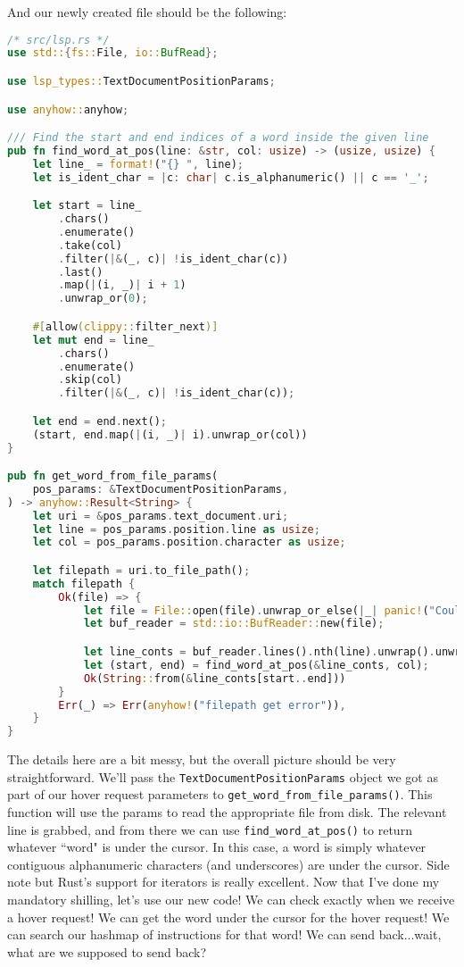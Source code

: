 And our newly created file should be the following:

\begin{lstlisting}[language=rust]
/* src/lsp.rs */
use std::{fs::File, io::BufRead};

use lsp_types::TextDocumentPositionParams;

use anyhow::anyhow;

/// Find the start and end indices of a word inside the given line
pub fn find_word_at_pos(line: &str, col: usize) -> (usize, usize) {
    let line_ = format!("{} ", line);
    let is_ident_char = |c: char| c.is_alphanumeric() || c == '_';

    let start = line_
        .chars()
        .enumerate()
        .take(col)
        .filter(|&(_, c)| !is_ident_char(c))
        .last()
        .map(|(i, _)| i + 1)
        .unwrap_or(0);

    #[allow(clippy::filter_next)]
    let mut end = line_
        .chars()
        .enumerate()
        .skip(col)
        .filter(|&(_, c)| !is_ident_char(c));

    let end = end.next();
    (start, end.map(|(i, _)| i).unwrap_or(col))
}

pub fn get_word_from_file_params(
    pos_params: &TextDocumentPositionParams,
) -> anyhow::Result<String> {
    let uri = &pos_params.text_document.uri;
    let line = pos_params.position.line as usize;
    let col = pos_params.position.character as usize;

    let filepath = uri.to_file_path();
    match filepath {
        Ok(file) => {
            let file = File::open(file).unwrap_or_else(|_| panic!("Couldn't open file -> {}", uri));
            let buf_reader = std::io::BufReader::new(file);

            let line_conts = buf_reader.lines().nth(line).unwrap().unwrap();
            let (start, end) = find_word_at_pos(&line_conts, col);
            Ok(String::from(&line_conts[start..end]))
        }
        Err(_) => Err(anyhow!("filepath get error")),
    }
}
\end{lstlisting}

The details here are a bit messy, but the overall picture should be very straightforward. We'll pass the \texttt{TextDocumentPositionParams} object we got as part of our hover request parameters to \texttt{get\_word\_from\_file\_params()}. This function will use the params to read the appropriate file from disk. The relevant line is grabbed, and from there we can use \texttt{find\_word\_at\_pos()} to return whatever ``word" is under the cursor. In this case, a word is simply whatever contiguous alphanumeric characters (and underscores) are under the cursor. Side note but Rust's support for iterators is really excellent. Now that I've done my mandatory shilling, let's use our new code! We can check exactly when we receive a hover request! We can get the word under the cursor for
the hover request! We can search our hashmap of instructions for that word! We can send back...wait, what are we supposed to send back?

